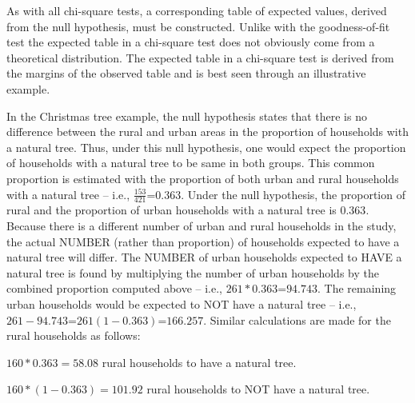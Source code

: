 \documentclass[10pt,openany]{book}\usepackage[]{graphicx}\usepackage[]{color}
\begin{document}
As with all chi-square tests, a corresponding table of expected values, derived from the null hypothesis, must be constructed.  Unlike with the goodness-of-fit test the expected table in a chi-square test does not obviously come from a theoretical distribution.  The expected table in a chi-square test is derived from the margins of the observed table and is best seen through an illustrative example.

In the Christmas tree example, the null hypothesis states that there is no difference between the rural and urban areas in the proportion of households with a natural tree.  Thus, under this null hypothesis, one would expect the proportion of households with a natural tree to be same in both groups.  This common proportion is estimated with the proportion of both urban and rural households with a natural tree -- i.e., $\frac{153}{421}$=$0.363$.  Under the null hypothesis, the proportion of rural and the proportion of urban households with a natural tree is $0.363$.  Because there is a different number of urban and rural households in the study, the actual NUMBER (rather than proportion) of households expected to have a natural tree will differ.  The NUMBER of urban households expected to HAVE a natural tree is found by multiplying the number of urban households by the combined proportion computed above -- i.e., $261*0.363$=$94.743$.  The remaining urban households would be expected to NOT have a natural tree -- i.e., $261-94.743$=$261(1-0.363)$=$166.257$.  Similar calculations are made for the rural households as follows:
\begin{Itemize}
  \item $160*0.363=58.08$ rural households to have a natural tree.
  \item $160*(1-0.363)=101.92$ rural households to NOT have a natural tree.
\end{Itemize}
\end{document}
